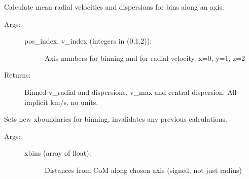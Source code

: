\documentclass[letterpaper,10pt,english]{sphinxmanual}
\begin{document}
\begin{fulllineitems}
\begin{fulllineitems}
\begin{description}
\begin{description}
\end{description}

\end{description}

\end{fulllineitems}


\begin{fulllineitems}
\label{\detokenize{remvdisp:galaxy.remvdisp.Vdisp.calc_v_sigma}}
Calculate mean radial velocities and dispersions for bins along an axis.
\begin{description}
\item[{Args:}] \leavevmode\begin{description}
\item[{pos\_index, v\_index (integers in (0,1,2)):}] \leavevmode
Axis numbers for binning and for radial velocity.
x=0, y=1, z=2

\end{description}

\item[{Returns:}] \leavevmode
Binned v\_radial and dispersions, v\_max and central dispersion. 
All implicit km/s, no units.

\end{description}

\end{fulllineitems}


\begin{fulllineitems}
\label{\detokenize{remvdisp:galaxy.remvdisp.Vdisp.set_xbins}}
Sets new x\sphinxhyphen{}boundaries for binning, invalidates any previous calculations.
\begin{description}
\item[{Args:}] \leavevmode\begin{description}
\item[{xbins (array of float):}] \leavevmode
Distances from CoM along chosen axis (signed, not just radius)

\end{description}


\end{description}
\end{fulllineitems}
\end{fulllineitems}
\end{document}

